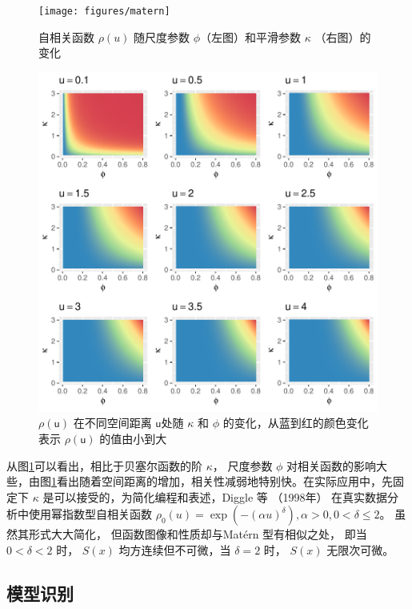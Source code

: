 \documentclass[12pt,a4paper,UTF8,twoside]{book}
\theoremstyle{definition}
\theoremstyle{definition}
\theoremstyle{definition}
\theoremstyle{remark}
\begin{document}
\begin{figure}

{\centering \texttt{[image: figures/matern]} 

}

\caption{自相关函数 $\rho(u)$ 随尺度参数 $\phi$（左图）和平滑参数 $\kappa$ （右图）的变化}\label{fig:matern-2d}
\end{figure}
\begin{figure}[!htb]

{\centering \includegraphics[width=0.8\linewidth]{figures/matern-3d} 

}

\caption{$\rho(\mathsf{u})$ 在不同空间距离 $\mathsf{u}$处随 $\kappa$ 和 $\phi$ 的变化，从蓝到红的颜色变化表示 $\rho(\mathsf{u})$ 的值由小到大}\label{fig:matern-3d}
\end{figure}

从图\ref{fig:matern-2d}可以看出，相比于贝塞尔函数的阶 \(\kappa\)， 尺度参数 \(\phi\) 对相关函数的影响大些，由图\ref{fig:matern-2d}看出随着空间距离的增加，相关性减弱地特别快。在实际应用中，先固定下 \(\kappa\) 是可以接受的，为简化编程和表述，Diggle 等 （1998年） \citep{Diggle1998} 在真实数据分析中使用幂指数型自相关函数 \(\rho_{0}(u) = \exp(-(\alpha u)^{\delta}), \alpha > 0, 0 < \delta \leq 2\)。 虽然其形式大大简化， 但函数图像和性质却与Matérn 型有相似之处， 即当 \(0 < \delta < 2\) 时， \(S(x)\) 均方连续但不可微，当 \(\delta = 2\) 时， \(S(x)\) 无限次可微。

\hypertarget{subsec:identify}{%
\subsection{模型识别}\label{subsec:identify}}
\end{document}
